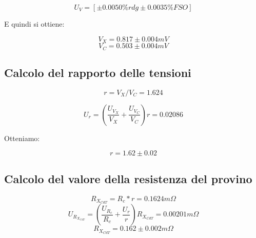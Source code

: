 \documentclass[a4paper]{article}
\begin{document}
\begin{Large} 
	\begin{equation}
		U_{V} = [\pm 0.0050\%rdg \pm 0.0035\% FSO]
	 \end{equation}
\end{Large}
E quindi si ottiene:
\begin{Large} 
	\begin{equation}
		V_X = 0.817 \pm 0.004 mV
	 \end{equation}
	 \begin{equation}
		V_C = 0.503 \pm 0.004 mV
	 \end{equation}
\end{Large}
\subsection{Calcolo del rapporto delle tensioni}
\begin{Large}
	\begin{equation}
		r = {V_X}/{V_C}= 1.624
	 \end{equation}
\end{Large}
\begin{Large} 
	 \begin{equation}
		U_{r} = (\frac{U_{V_X}}{V_X}+\frac{U_{V_C}}{V_C})r = 0.02086
	 \end{equation}
\end{Large}
Otteniamo:
\begin{Large} 
	\begin{equation}
		r = 1.62 \pm 0.02
	 \end{equation}
\end{Large}
\subsection{Calcolo del valore della resistenza del provino}
\begin{Large} 
	\begin{equation}
		R_{X_{CdT}} = R_c* r = 0.1624 m\Omega
	 \end{equation}
	 \begin{equation}
		U_{R_{X_{CdT}}} =(\frac{U_{R_c}}{R_c}+ \frac{U_r}{r})R_{X_{CdT}}= 0.00201 m\Omega
	 \end{equation}
	 \begin{equation}
		R_{X_{CdT}} = 0.162 \pm 0.002  m\Omega
	 \end{equation}
\end{Large}
\end{document}
